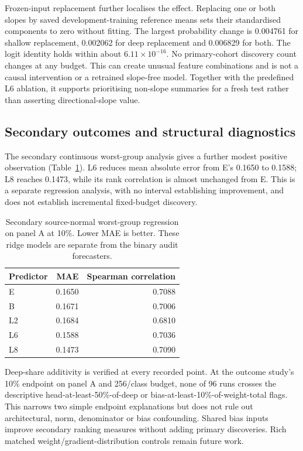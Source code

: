 \documentclass[nolineno]{ieeeaccess}
\begin{document}
Frozen-input replacement further localises the effect. Replacing one or both slopes by saved development-training reference means sets their standardised components to zero without fitting. The largest probability change is 0.004761 for shallow replacement, 0.002062 for deep replacement and 0.006829 for both. The logit identity holds within about $6.11\times10^{-16}$. No primary-cohort discovery count changes at any budget. This can create unusual feature combinations and is not a causal intervention or a retrained slope-free model. Together with the predefined L6 ablation, it supports prioritising non-slope summaries for a fresh test rather than asserting directional-slope value.

\subsection{Secondary outcomes and structural diagnostics}
The secondary continuous worst-group analysis gives a further modest positive observation (Table~\ref{tab:ridge}). L6 reduces mean absolute error from E's 0.1650 to 0.1588; L8 reaches 0.1473, while its rank correlation is almost unchanged from E. This is a separate regression analysis, with no interval establishing improvement, and does not establish incremental fixed-budget discovery.

\begin{table}[t]
\caption{Secondary source-normal worst-group regression on panel A at 10\%. Lower MAE is better. These ridge models are separate from the binary audit forecasters.}
\label{tab:ridge}
\centering\small
\begin{tabular}{lrr}
\toprule Predictor & MAE & Spearman correlation\\\midrule
E &0.1650&0.7088\\
B &0.1671&0.7006\\
L2&0.1684&0.6810\\
L6&0.1588&0.7036\\
L8&0.1473&0.7090\\\bottomrule
\end{tabular}
\end{table}

Deep-share additivity is verified at every recorded point. At the outcome study's 10\% endpoint on panel A and 256/class budget, none of 96 runs crosses the descriptive head-at-least-50\%-of-deep or bias-at-least-10\%-of-weight-total flags. This narrows two simple endpoint explanations but does not rule out architectural, norm, denominator or bias confounding. Shared bias inputs improve secondary ranking measures without adding primary discoveries. Rich matched weight/gradient-distribution controls remain future work.
\end{document}
